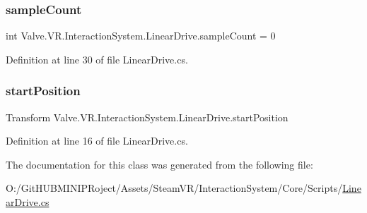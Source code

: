 \mbox{\label{class_valve_1_1_v_r_1_1_interaction_system_1_1_linear_drive_a4eee470e177540a1eb4e301391927090}} 
\subsubsection{\texorpdfstring{sampleCount}{sampleCount}}
{\footnotesize\ttfamily int Valve.\+V\+R.\+Interaction\+System.\+Linear\+Drive.\+sample\+Count = 0\hspace{0.3cm}{\ttfamily [protected]}}



Definition at line 30 of file Linear\+Drive.\+cs.

\mbox{\label{class_valve_1_1_v_r_1_1_interaction_system_1_1_linear_drive_ac9c2e3bc515634ca7a32e71b3ca75e1d}} 
\subsubsection{\texorpdfstring{startPosition}{startPosition}}
{\footnotesize\ttfamily Transform Valve.\+V\+R.\+Interaction\+System.\+Linear\+Drive.\+start\+Position}



Definition at line 16 of file Linear\+Drive.\+cs.



The documentation for this class was generated from the following file\+:\begin{DoxyCompactItemize}
\item 
O\+:/\+Git\+H\+U\+B\+M\+I\+N\+I\+P\+Roject/\+Assets/\+Steam\+V\+R/\+Interaction\+System/\+Core/\+Scripts/\mbox{\hyperlink{_linear_drive_8cs}{Linear\+Drive.\+cs}}\end{DoxyCompactItemize}
